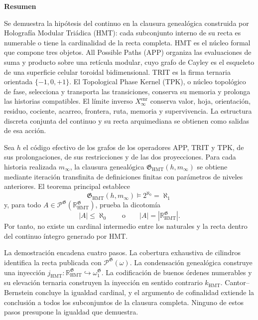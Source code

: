 \begingroup
\begin{center}\textbf{Resumen}\end{center}
\fontsize{9.1}{10.55}\selectfont
\setlength{\parskip}{1.2pt}
\setlength{\abovedisplayskip}{3pt}
\setlength{\belowdisplayskip}{3pt}
Se demuestra la hipótesis del continuo en la clausura genealógica construida
por Holografía Modular Triádica (HMT): cada subconjunto interno de su recta es
numerable o tiene la cardinalidad de la recta completa. HMT es el núcleo formal
que compone tres objetos. All Possible Paths (APP) organiza las evaluaciones
de suma y producto sobre una retícula modular, cuyo grafo de Cayley es el
esqueleto de una superficie celular toroidal bidimensional. TRIT es la firma
ternaria orientada \(\{-1,0,+1\}\). El Topological Phase Kernel (TPK), o núcleo
topológico de fase, selecciona y transporta las transiciones, conserva su
memoria y prolonga las historias compatibles. El límite inverso
\(X_\infty^{\mathrm{enr}}\) conserva valor, hoja, orientación, residuo,
cociente, acarreo, frontera, ruta, memoria y supervivencia. La estructura
discreta conjunta del continuo y su recta arquimediana se obtienen como salidas
de esa acción.

Sea \(h\) el código efectivo de los grafos de los operadores APP, TRIT y TPK,
de sus prolongaciones, de sus restricciones y de las dos proyecciones. Para
cada historia realizada \(m_\infty\), la clausura genealógica
\(\mathfrak G_{\mathrm{HMT}}(h,m_\infty)\) se obtiene mediante iteración
transfinita de definiciones finitas con parámetros de niveles anteriores. El
teorema principal establece
\[
 \boxed{\mathfrak G_{\mathrm{HMT}}(h,m_\infty)
 \models 2^{\aleph_0}=\aleph_1}
\]
y, para todo
\(A\in\mathcal P^{\mathfrak G}
(\mathbb R_{\mathrm{HMT}}^{\mathfrak G})\), prueba la dicotomía
\[
 |A|\leq\aleph_0
 \qquad\text{o}\qquad
 |A|=|\mathbb R_{\mathrm{HMT}}^{\mathfrak G}|.
\]
Por tanto, no existe un cardinal intermedio entre los naturales y la recta
dentro del continuo íntegro generado por HMT.

La demostración encadena cuatro pasos. La cobertura exhaustiva de cilindros
identifica la recta publicada con
\(\mathcal P^{\mathfrak G}(\omega)\). La condensación genealógica construye
una inyección
\(j_{\mathrm{HMT}}:\mathbb R_{\mathrm{HMT}}^{\mathfrak G}
\hookrightarrow\omega_1^{\mathfrak G}\). La codificación de buenos órdenes
numerables y su elevación ternaria construyen la inyección en sentido contrario
\(k_{\mathrm{HMT}}\). Cantor--Bernstein concluye la igualdad cardinal, y el
argumento de cofinalidad extiende la conclusión a todos los subconjuntos de la
clausura completa. Ninguno de estos pasos presupone la igualdad que demuestra.

